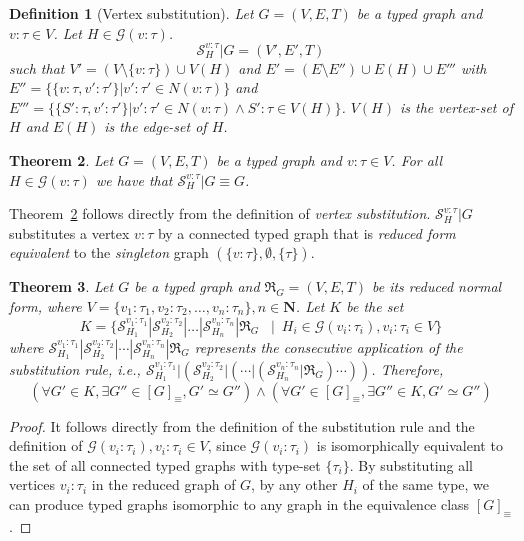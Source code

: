 \documentclass[preprint,12pt]{elsarticle}
\theoremstyle{plain}
\newtheorem{theorem}{Theorem}[section]
\newtheorem{definition}[theorem]{Definition}
\newcommand\tyv[2]{#1\!\!:\!\!#2}
\begin{document}
\begin{definition}[Vertex substitution]
Let $G = (V,E,T)$ be a typed graph and $\tyv{v}{\tau}\in V$.
Let $H\in\mathcal{G}(\tyv{v}{\tau})$.
\[
\mathcal{S}^{v:\tau}_H|G = (V',E',T)
\]
such that
$V' = (V\setminus\{\tyv{v}{\tau}\})\cup V(H)$
and
$E' = (E\setminus E'')\cup E(H)\cup E'''$
with
$E'' = \{ \{\tyv{v}{\tau},\tyv{v'}{\tau'}\}| \tyv{v'}{\tau'}\in N(\tyv{v}{\tau})\}$
and
$E''' = \{ \{\tyv{S'}{\tau},\tyv{v'}{\tau'}\}|\tyv{v'}{\tau'}\in N(\tyv{v}{\tau}) \wedge\allowbreak\tyv{S'}{\tau}\in V(H)\}$.
$V(H)$ is the vertex-set of $H$ and $E(H)$ is the edge-set of $H$.
\end{definition}

\begin{theorem}\label{theorem:substEquiv}
Let $G = (V,E,T)$ be a typed graph and $\tyv{v}{\tau}\in V$.
For all $H\in\mathcal{G}(\tyv{v}{\tau})$ we have that $\mathcal{S}^{v:\tau}_H|G \equiv G$.
\end{theorem}

Theorem~\ref{theorem:substEquiv} follows directly from the definition of \textit{vertex substitution}.
$\mathcal{S}^{v:\tau}_H|G$ substitutes a vertex $\tyv{v}{\tau}$ by a connected typed graph
that is \textit{reduced form equivalent} to the \textit{singleton} graph $(\{\tyv{v}{\tau}\},\emptyset,\{\tau\})$.

\begin{theorem}\label{theorem:isEquivClass}
Let $G$ be a typed graph and $\Re_G = (V,E,T)$ be its reduced normal form, where $V = \{\tyv{v_1}{\tau_1}, \tyv{v_2}{\tau_2}, \ldots, \tyv{v_n}{\tau_n}\}, n\in \mathbf{N}$.
Let $K$ be the set
\[
K = \{ \mathcal{S}^{{v_1}:{\tau_1}}_{H_1}|\mathcal{S}^{{v_2}:{\tau_2}}_{H_2}|\dots|\mathcal{S}^{{v_n}:{\tau_n}}_{H_n}|\Re_G
             \,\,\,\,\,|\,\,\,   H_i\in\mathcal{G}(\tyv{v_i}{\tau_i}),\tyv{v_i}{\tau_i}\in V\}
\]
where $\mathcal{S}^{{v_1}:{\tau_1}}_{H_1}|\mathcal{S}^{{v_2}:{\tau_2}}_{H_2}|\cdots|\mathcal{S}^{{v_n}:{\tau_n}}_{H_n}|\Re_G$
represents the consecutive application of the substitution rule, i.e.,
$\mathcal{S}^{{v_1}:{\tau_1}}_{H_1}|\left(\mathcal{S}^{{v_2}:{\tau_2}}_{H_2}|\left(\cdots|\left(\mathcal{S}^{{v_n}:{\tau_n}}_{H_n}|\Re_G\right)\cdots\right)\right)$.
Therefore,
\[
(\forall G'\in K, \exists G''\in[G]_\equiv, G'\simeq G'') \wedge
(\forall G'\in[G]_\equiv, \exists G''\in K, G'\simeq G'')
\]
\end{theorem}
\begin{proof}
It follows directly from the definition of the substitution rule and the definition of $\mathcal{G}(\tyv{v_i}{\tau_i}),\tyv{v_i}{\tau_i}\in V$,
since $\mathcal{G}(\tyv{v_i}{\tau_i})$ is isomorphically equivalent to the set of all connected typed graphs with type-set $\{\tau_i\}$.
By substituting all vertices $\tyv{v_i}{\tau_i}$ in the reduced graph of $G$,
by any other $H_i$ of the same type, we can produce typed graphs isomorphic to
any graph in the equivalence class $[G]_\equiv$.
\end{proof}
\end{document}
